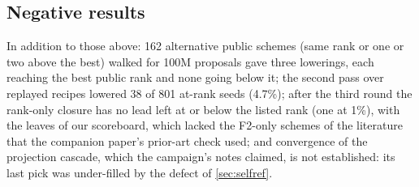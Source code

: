 \subsection{Negative results}
In addition to those above: 162 alternative public schemes (same rank or one or two above the best) walked for 100M proposals gave three lowerings, each reaching the best public rank and none going below it; the second pass over replayed recipes lowered 38 of 801 at-rank seeds (4.7\%);
after the third round the rank-only closure has no lead left at or below the listed rank (one at 1\%), with the leaves of our scoreboard, which lacked the F2-only schemes of the literature that the companion paper's prior-art check used; and convergence of the projection cascade, which the campaign's notes claimed, is not established: its last pick was under-filled by the defect of \cref{sec:selfref}.
